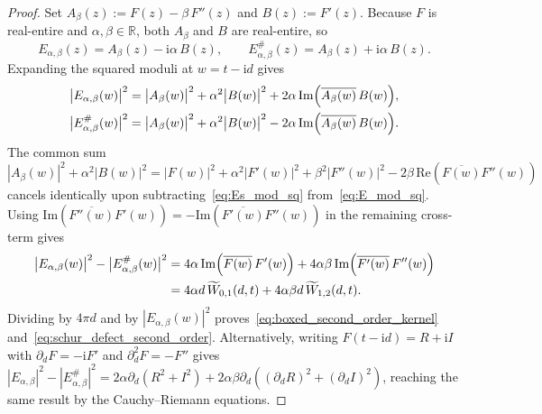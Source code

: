 \documentclass[11pt,reqno]{amsart}
\theoremstyle{definition}
\theoremstyle{remark}
\numberwithin{equation}{section}
\newcommand{\R}{\mathbb{R}}
\newcommand{\ii}{\mathrm{i}}
\newcommand{\Rea}{\mathrm{Re}}
\newcommand{\Ima}{\mathrm{Im}}
\begin{document}
\begin{proof}
Set $A_\beta(z) := F(z) - \beta\,F''(z)$ and $B(z) := F'(z)$. Because $F$ is real-entire and $\alpha, \beta \in \R$, both $A_\beta$ and $B$ are real-entire, so
\begin{equation}\label{eq:A_beta_B_decomp}
E_{\alpha,\beta}(z) = A_\beta(z) - \ii\alpha\,B(z), \qquad E_{\alpha,\beta}^\#(z) = A_\beta(z) + \ii\alpha\,B(z).
\end{equation}
Expanding the squared moduli at $w = t - \ii d$ gives
\begin{align}
\bigl|E_{\alpha,\beta}(w)\bigr|^2 &= \bigl|A_\beta(w)\bigr|^2 + \alpha^2\bigl|B(w)\bigr|^2 + 2\alpha\,\Ima\Bigl(\overline{A_\beta(w)}\,B(w)\Bigr), \label{eq:E_mod_sq} \\
\bigl|E_{\alpha,\beta}^\#(w)\bigr|^2 &= \bigl|A_\beta(w)\bigr|^2 + \alpha^2\bigl|B(w)\bigr|^2 - 2\alpha\,\Ima\Bigl(\overline{A_\beta(w)}\,B(w)\Bigr). \label{eq:Es_mod_sq}
\end{align}
The common sum $|A_\beta(w)|^2 + \alpha^2|B(w)|^2 = |F(w)|^2 + \alpha^2|F'(w)|^2 + \beta^2|F''(w)|^2 - 2\beta\,\Rea(\overline{F(w)}F''(w))$ cancels identically upon subtracting~\eqref{eq:Es_mod_sq} from~\eqref{eq:E_mod_sq}. Using $\Ima(\overline{F''(w)}F'(w)) = -\Ima(\overline{F'(w)}F''(w))$ in the remaining cross-term gives
\[
\begin{aligned}
\bigl|E_{\alpha,\beta}(w)\bigr|^2 - \bigl|E_{\alpha,\beta}^\#(w)\bigr|^2 &= 4\alpha\,\Ima\Bigl(\overline{F(w)}\,F'(w)\Bigr) + 4\alpha\beta\,\Ima\Bigl(\overline{F'(w)}\,F''(w)\Bigr) \\
&= 4\alpha d\,\widetilde{W}_{0,1}(d,t) + 4\alpha\beta d\,\widetilde{W}_{1,2}(d,t).
\end{aligned}
\]
Dividing by $4\pi d$ and by $|E_{\alpha,\beta}(w)|^2$ proves~\eqref{eq:boxed_second_order_kernel} and~\eqref{eq:schur_defect_second_order}. Alternatively, writing $F(t-\ii d) = R + \ii I$ with $\partial_d F = -\ii F'$ and $\partial_d^2 F = -F''$ gives $|E_{\alpha,\beta}|^2 - |E_{\alpha,\beta}^\#|^2 = 2\alpha\partial_d(R^2+I^2) + 2\alpha\beta\partial_d((\partial_d R)^2 + (\partial_d I)^2)$, reaching the same result by the Cauchy--Riemann equations.
\end{proof}
\end{document}
